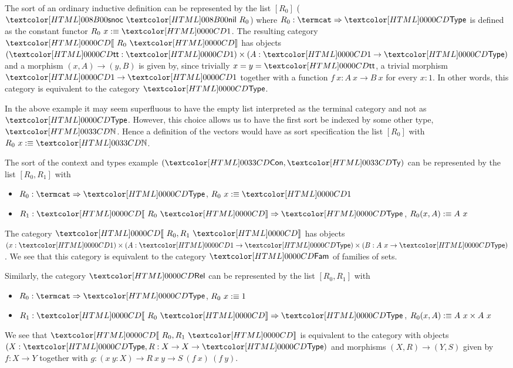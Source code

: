 \begin{example}
  The sort of an ordinary inductive definition can be represented by
  the list $[R_0]$ (\ie $\sortssnoc\ \sortsnil\ R_0$) where
  $R_0 : \Func{\termcat}{\Type}$ is defined as the constant functor
  $R_0\ x \ddefeq \unitty$. The resulting category $\SortCat{R_0}$ has
  objects $(\unitval : \unitty) \times (A : \unitty \to \Type)$ and a
  morphism $(x, A) \to (y, B)$ is given by, since trivially
  $x = y = \unitval$, a trivial morphism $\unitty \to \unitty$
  together with a function $f\ x : A\ x \to B\ x$ for every $x : 1$. In
  other words, this category is equivalent to the category $\Type$.
\end{example}

In the above example it may seem superfluous to have the empty list
interpreted as the terminal category and not as $\Type$. However, this
choice allows us to have the first sort be indexed by some other type,
\eg $\natty$. Hence a definition of the vectors would have as sort
specification the list $[R_0]$ with $R_0\ x \ddefeq \natty$.

\begin{example}
  The sort of the context and types example $(\ttconty, \tttyty)$ can be
  represented by the list $[R_0, R_1]$ with
  \begin{itemize}
  \item $R_0 : \Func{\termcat}{\Type}$, $R_0\ x \ddefeq \unitty$
  \item $R_1 : \Func{\SortCat{R_0}}{\Type}$, $R_0 (x, A) :\equiv A\ x$
  \end{itemize}
  The category $\SortCat{R_0,R_1}$ has objects
  $(x : \unitty) \times (A : \unitty \to \Type) \times (B : A\ x \to
  \Type)$.
  We see that this category is equivalent to the category $\Fam$ of
  families of sets.
\end{example}

\begin{example}
  \label{rel-sorts}
  Similarly, the category $\Rel$ can be represented by the list
  $[R_0, R_1]$ with
  \begin{itemize}
  \item $R_0 : \Func{\termcat}{\Type}$, $R_0\ x :\equiv 1$
  \item $R_1 : \Func{\SortCat{R_0}}{\Type}$, $R_0 (x, A) :\equiv A\ x \times A\ x$
  \end{itemize}
  We see that $\SortCat{R_0,R_1}$ is equivalent to the category with
  objects $(X : \Type, R : X \to X \to \Type)$ and morphisms
  $(X,R) \to (Y,S)$ given by $f : X \to Y$ together with
  $g : (x\ y: X) \to R\ x\ y \to S\ (f\ x)\ (f\ y)$.
\end{example}

